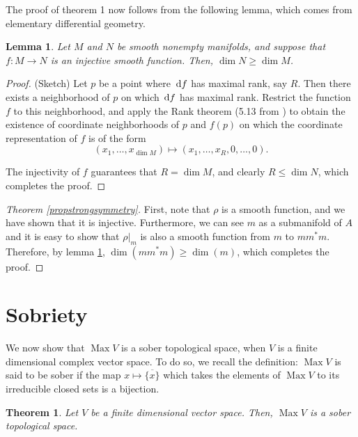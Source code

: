 \documentclass{article}
\theoremstyle{plain}
\newtheorem{theorem}{Theorem}
\newtheorem{lemma}{Lemma}
\theoremstyle{nonumberplain}
\newtheorem{proof}{Proof}
\DeclareMathOperator{\Max}{Max}
\begin{document}
The proof of theorem 1 now follows from the following lemma, which comes from elementary differential geometry.

\begin{lemma}\label{lemma1}
Let $M$ and $N$ be smooth nonempty manifolds, and suppose that $f \colon M \to N$ is an injective smooth function. Then, $\dim N \geq \dim M$.
\end{lemma}

\begin{proof} (Sketch)
Let $p$ be a point where $\dl f$ has maximal rank, say $R$. Then there exists a neighborhood of $p$ on which $\dl f$ has maximal rank. Restrict the function $f$ to this neighborhood, and apply the Rank theorem (5.13 from \cite{leesmooth}) to obtain the existence of coordinate neighborhoods of $p$ and $f(p)$ on which the coordinate representation of $f$ is of the form
\begin{equation}
(x_1, \dots, x_{\dim M}) \mapsto (x_1, \dots, x_R, 0, \dots, 0).
\end{equation}

The injectivity of $f$ guarantees that $R = \dim M$, and clearly $R \leq \dim N$, which completes the proof.
\end{proof}

\begin{proof}[Theorem \ref{propstrongsymmetry}]
First, note that $\rho$ is a smooth function, and we have shown that it is injective. Furthermore, we can see $m$ as a submanifold of $A$ and it is easy to show that $\rho|_m$ is also a smooth function from $m$ to $m m^* m$. Therefore, by lemma \ref{lemma1}, $\dim(m m^* m) \geq \dim(m)$, which completes the proof.
\end{proof}

\section{Sobriety}

We now show that $\Max V$ is a sober topological space, when $V$ is a finite dimensional complex vector space. To do so, we recall the definition: $\Max V$ is said to be sober if the map $x \mapsto \overline{\{x\}}$ which takes the elements of $\Max V$ to its irreducible closed sets is a bijection.

\begin{theorem}\label{thm:sober}
Let $V$ be a finite dimensional vector space. Then, $\Max V$ is a sober topological space.
\end{theorem}
\end{document}
